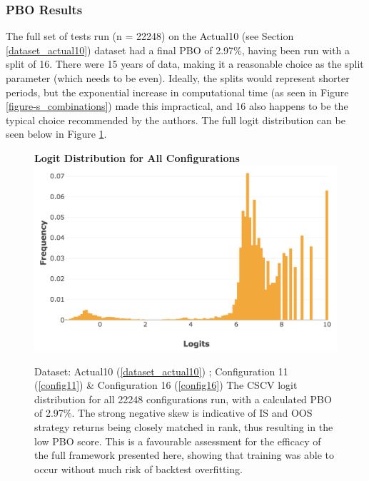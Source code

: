 \documentclass[a4paper,11pt,oneside]{article}
\theoremstyle{plain}
\theoremstyle{definition}
\begin{document}
	
	\subsubsection{PBO Results}\label{results_pbo_stats}
	
	The full set of tests run (n = 22248) on the Actual10 (see Section \ref{dataset_actual10}) dataset had a final PBO of 2.97\%, having been run with a split of 16. There were 15 years of data, making it a reasonable choice as the split parameter (which needs to be even). Ideally, the splits would represent shorter periods, but the exponential increase in computational time (as seen in Figure \ref{figure-s_combinations}) made this impractical, and 16 also happens to be the typical choice recommended by the authors. The full logit distribution can be seen below in Figure \ref{figure-results_logits_all}.
	
	\begin{figure}[H]
		\centering 
		\textbf{Logit Distribution for All Configurations}
		\includegraphics[scale=0.3]{images/results/8_9_pbo/all_sets_dist.png} 
		\caption[Logit Distribution for All Configurations]{Dataset: Actual10 (\ref{dataset_actual10}) ; Configuration 11 (\ref{config11}) \&  Configuration 16 (\ref{config16})
			\newline The CSCV logit distribution for all 22248 configurations run, with a calculated PBO of 2.97\%. The strong negative skew is indicative of IS and OOS strategy returns being closely matched in rank, thus resulting in the low PBO score. This is a favourable assessment for the efficacy of the full framework presented here, showing that training was able to occur without much risk of backtest overfitting. }
		\label{figure-results_logits_all}
	\end{figure}
	
\end{document}
